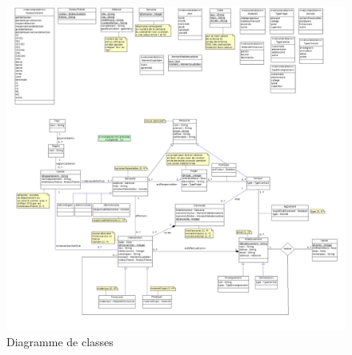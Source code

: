 \begin{figure}[H]
	\centering
	\includegraphics[scale=0.3]{diagrammeClasse/images/diagrammeDeClasses}
	\caption{Diagramme de classes}
	\label{diagramme_classe}	
\end{figure}	